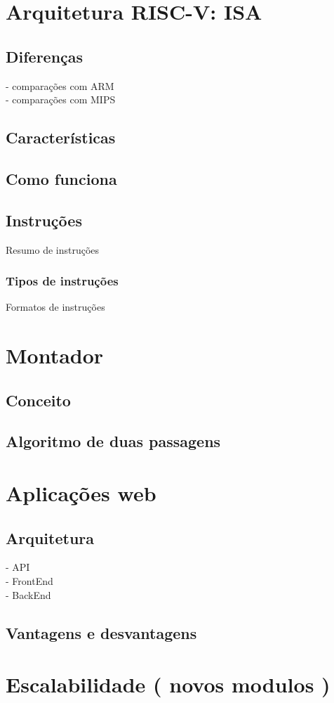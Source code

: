 \section{Arquitetura RISC-V: ISA}
	\subsection{Diferenças}
		- comparações com ARM\\
		- comparações com MIPS\\
	\subsection{Características}
	\subsection{Como funciona}
	\subsection{Instruções}
		Resumo de instruções\\
		\subsubsection{Tipos de instruções}
		Formatos de instruções

\section{Montador}


	\subsection{Conceito}

	\subsection{Algoritmo de duas passagens}

\section{Aplicações web}

	\subsection{Arquitetura}
		- API\\
		- FrontEnd\\
		- BackEnd \\

	\subsection{Vantagens e desvantagens}


\section{Escalabilidade ( novos modulos )}
